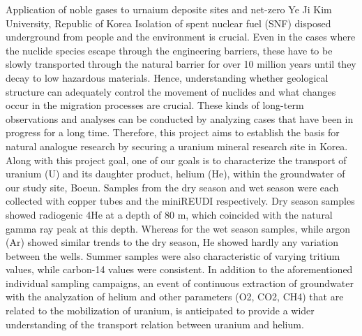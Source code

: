 \begin{conf-abstract}
{Application of noble gases to urnaium deposite sites and net-zero}
{Ye Ji Kim}
{University, Republic of Korea}
{Isolation of spent nuclear fuel (SNF) disposed underground from people and the environment is crucial. Even in the cases where the nuclide species escape through the engineering barriers, these have to be slowly transported through the natural barrier for over 10 million years until they decay to low hazardous materials. Hence, understanding whether geological structure can adequately control the movement of nuclides and what changes occur in the migration processes are crucial. These kinds of long-term observations and analyses can be conducted by analyzing cases that have been in progress for a long time. Therefore, this project aims to establish the basis for natural analogue research by securing a uranium mineral research site in Korea. Along with this project goal, one of our goals is to characterize the transport of uranium (U) and its daughter product, helium (He), within the groundwater of our study site, Boeun. Samples from the dry season and wet season were each collected with copper tubes and the miniREUDI respectively. Dry season samples showed radiogenic 4He at a depth of 80 m, which coincided with the natural gamma ray peak at this depth. Whereas for the wet season samples, while argon (Ar) showed similar trends to the dry season, He showed hardly any variation between the wells. Summer samples were also characteristic of varying tritium values, while carbon-14 values were consistent. In addition to the aforementioned individual sampling campaigns, an event of continuous extraction of groundwater with the analyzation of helium and other parameters (O2, CO2, CH4) that are related to the mobilization of uranium, is anticipated to provide a wider understanding of the transport relation between uranium and helium.}
\end{conf-abstract}
